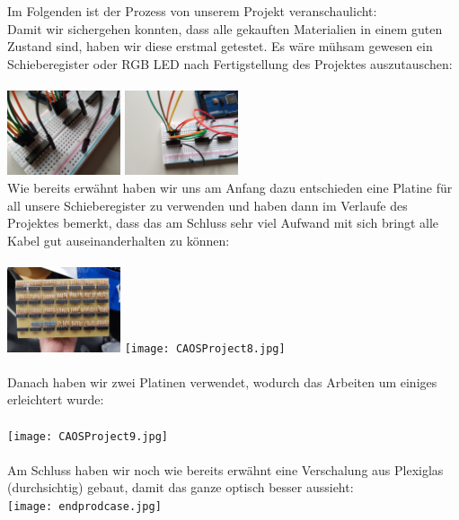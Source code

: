 \documentclass[12pt,a4paper]{article}
\begin{document}
Im Folgenden ist der Prozess von unserem Projekt veranschaulicht: \\

Damit wir sichergehen konnten, dass alle gekauften Materialien in einem guten Zustand sind, haben wir diese erstmal 
getestet. Es wäre mühsam gewesen ein Schieberegister oder RGB LED nach Fertigstellung des Projektes auszutauschen: \\\\
\includegraphics[width=0.25\textwidth]{CAOSProject3.jpg}
\includegraphics[width=0.25\textwidth]{CAOSProject5.jpg} \\

Wie bereits erwähnt haben wir uns am Anfang dazu entschieden eine Platine für all unsere Schieberegister zu verwenden 
und haben dann im Verlaufe des Projektes bemerkt, dass das am Schluss sehr viel Aufwand mit sich bringt alle Kabel gut
auseinanderhalten zu können: \\\\
\includegraphics[width=0.25\textwidth]{CAOSProject7.jpg}
\texttt{[image: CAOSProject8.jpg]} \\\\

Danach haben wir zwei Platinen verwendet, wodurch das Arbeiten um einiges erleichtert wurde: \\\\
\texttt{[image: CAOSProject9.jpg]} \\\\

Am Schluss haben wir noch wie bereits erwähnt eine Verschalung aus Plexiglas (durchsichtig) gebaut, 
damit das ganze optisch besser aussieht: \\
\texttt{[image: endprodcase.jpg]}
\end{document}
